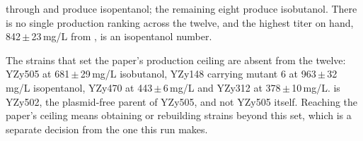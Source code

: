 

 through  and  produce isopentanol; the
remaining eight produce isobutanol. There is no single production ranking across
the twelve, and the highest titer on hand, 842\,$\pm$\,23\,mg/L from
, is an isopentanol number.

The strains that set the paper's production ceiling are absent from the twelve:
YZy505 at 681\,$\pm$\,29\,mg/L isobutanol, YZy148 carrying  mutant 6
at 963\,$\pm$\,32\,mg/L isopentanol, YZy470 at 443\,$\pm$\,6\,mg/L and YZy312 at
378\,$\pm$\,10\,mg/L.  is YZy502, the plasmid-free parent of
YZy505, and not YZy505 itself. Reaching the paper's ceiling means obtaining or
rebuilding strains beyond this set, which is a separate decision from the one
this run makes.
